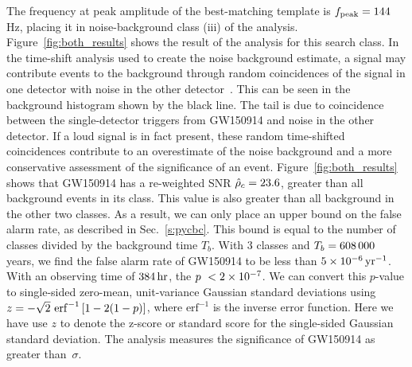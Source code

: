 The frequency at peak amplitude of the best-matching template is
$f_{\mathrm{peak}} = 144\,$Hz, placing it in
noise-background class (iii) of the \pycbc{} analysis.
Figure~\ref{fig:both_results} shows the result of the \pycbc{} analysis
for this search class.  In the time-shift analysis used to create the noise
background estimate, a signal may contribute events
to the background through random coincidences of the signal in one
detector with noise in the other detector~\cite{Capano:2016uif}.  This can be
seen in the background histogram shown by the black line. The tail is due
to coincidence between the single-detector triggers from GW150914 and noise in
the other detector.  If a loud signal is in fact present, these random
time-shifted coincidences contribute to an overestimate of the noise
background and a more conservative assessment of the significance of an event.
Figure~\ref{fig:both_results} shows that GW150914 has a re-weighted SNR
$\hat{\rho}_c = 23.6$, greater than all background events in its
class. This value is also greater than all background in the other two
classes. As a result, we can only place an upper bound on the false alarm
rate, as described in Sec.~\ref{s:pycbc}. This bound is equal to the number of
classes divided by the background time $T_b$. With $3$ classes and $T_b =
608\,000$ years, we find the false alarm rate of GW150914 to be less
than $5 \times 10^{-6}\,\text{yr}^{-1}$. With an observing time of $384\,\mathrm{hr}$,
the $p~< 2\times 10^{-7}$.  We can convert this
$p$-value to single-sided zero-mean, unit-variance Gaussian standard deviations
using $z=-\sqrt{2}\ \mathrm{erf}^{-1}\left[1 - 2(1-p)\right]$, where
$\mathrm{erf}^{-1}$ is the inverse error function. Here we have use $z$
to denote the z-score or standard score for the single-sided
Gaussian standard deviation. The \pycbc{} analysis
measures the significance of GW150914 as greater than \CBCEVENTSIGMA
$\,\sigma$.
